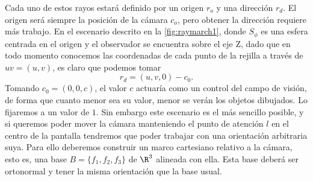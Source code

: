 Cada uno de estos rayos estará definido por un origen $r_o$ y una dirección $r_d$. El origen será siempre la posición de la cámara $c_o$, pero obtener la dirección requiere más trabajo. En el escenario descrito en la \autoref{fig:raymarch1}, donde $S_{\phi}$ es una esfera centrada en el origen y el observador se encuentra sobre el eje Z, dado que en todo momento conocemos las coordenadas de cada punto de la rejilla a través de $uv = (u,v)$, es claro que podemos tomar
$$r_d = (u,v,0) - c_0.$$ 
Tomando $c_0 = (0,0,c)$, el valor $c$ actuaría como un control del campo de visión, de forma que cuanto menor sea su valor, menor se verán los objetos dibujados. Lo fijaremos a un valor de $1$. Sin embargo este escenario es el más sencillo posible, y si queremos poder mover la cámara manteniendo el punto de atención $l$ en el centro de la pantalla tendremos que poder trabajar con una orientación arbitraria suya. Para ello deberemos construir un marco cartesiano relativo a la cámara, esto es, una base $B=\{f_1,f_2,f_3\}$ de $\R^3$ alineada con ella. Esta base deberá ser ortonormal y tener la misma orientación que la base usual.\newline

